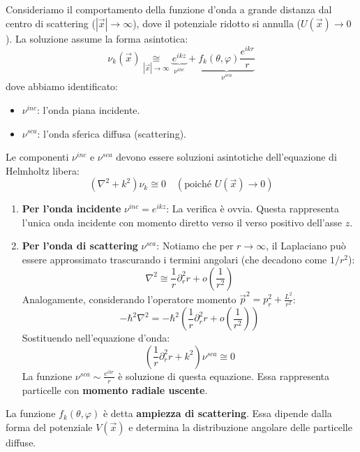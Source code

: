 Consideriamo il comportamento della funzione d'onda a grande distanza dal centro di scattering ($|\vec{x}| \to \infty$), dove il potenziale ridotto si annulla ($U(\vec{x}) \to 0$).
La soluzione assume la forma asintotica:
\begin{equation}
    \nu_k(\vec{x}) \underset{|\vec{x}|\to\infty}{\cong} \underbrace{e^{ikz}}_{\nu^{inc}} + \underbrace{f_k(\theta, \varphi) \frac{e^{ikr}}{r}}_{\nu^{sca}}
\end{equation}
dove abbiamo identificato:
\begin{itemize}
    \item $\nu^{inc}$: l'onda piana incidente.
    \item $\nu^{sca}$: l'onda sferica diffusa (scattering).
\end{itemize}
Le componenti $\nu^{inc}$ e $\nu^{sca}$ devono essere soluzioni asintotiche dell'equazione di Helmholtz libera:
\[
    \left( \nabla^2 + k^2 \right) \nu_k \cong 0 \quad (\text{poiché } U(\vec{x}) \to 0)
\]

\begin{enumerate}
    \item \textbf{Per l'onda incidente} $\nu^{inc} = e^{ikz}$:
    La verifica è ovvia. Questa rappresenta l'unica onda incidente con momento diretto verso il verso positivo dell'asse $z$.

    \item \textbf{Per l'onda di scattering} $\nu^{sca}$:
    Notiamo che per $r \to \infty$, il Laplaciano può essere approssimato trascurando i termini angolari (che decadono come $1/r^2$):
    \[
        \nabla^2 \cong \frac{1}{r}\partial_r^2 r + o\left(\frac{1}{r^2}\right)
    \]
    Analogamente, considerando l'operatore momento $\vec{p}^2 = p_r^2 + \frac{L^2}{r^2}$:
    \[
        -\hbar^2 \nabla^2 = -\hbar^2 \left( \frac{1}{r}\partial_r^2 r + o\left(\frac{1}{r^2}\right) \right)
    \]
    Sostituendo nell'equazione d'onda:
    \[
        \left( \frac{1}{r}\partial_r^2 r + k^2 \right) \nu^{sca} \cong 0
    \]
    La funzione $\nu^{sca} \sim \frac{e^{ikr}}{r}$ è soluzione di questa equazione. Essa rappresenta particelle con \textbf{momento radiale uscente}.
\end{enumerate}

\begin{definition}
    La funzione $f_k(\theta, \varphi)$ è detta \textbf{ampiezza di scattering}. Essa dipende dalla forma del potenziale $V(\vec{x})$ e determina la distribuzione angolare delle particelle diffuse.
\end{definition}

